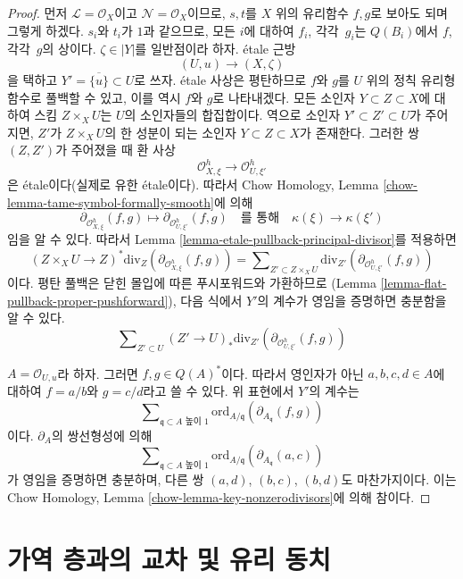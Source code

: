 \begin{proof}
\medskip\noindent
먼저 $\mathcal{L} = \mathcal{O}_X$이고
$\mathcal{N} = \mathcal{O}_X$이므로, $s, t$를 $X$ 위의 유리함수
$f, g$로 보아도 되며 그렇게 하겠다. $s_i$와 $t_i$가 $1$과 같으므로,
모든 $i$에 대하여 $f_i$, 각각\ $g_i$는 $Q(B_i)$에서 $f$, 각각\ $g$의
상이다. $\zeta \in |Y|$를 일반점이라 하자. \'etale 근방
$$
(U, u) \longrightarrow (X, \zeta)
$$
을 택하고 $Y' = \overline{\{u\}} \subset U$로 쓰자. \'etale 사상은
평탄하므로 $f$와 $g$를 $U$ 위의 정칙 유리형 함수로 풀백할 수 있고,
이를 역시 $f$와 $g$로 나타내겠다.
모든 소인자 $Y \subset Z \subset X$에 대하여 스킴
$Z \times_X U$는 $U$의 소인자들의 합집합이다. 역으로 소인자
$Y' \subset Z' \subset U$가 주어지면, $Z'$가 $Z \times_X U$의
한 성분이 되는 소인자 $Y \subset Z \subset X$가 존재한다.
그러한 쌍 $(Z, Z')$가 주어졌을 때 환 사상
$$
\mathcal{O}_{X, \xi}^h \to \mathcal{O}_{U, \xi'}^h
$$
은 \'etale이다(실제로 유한 \'etale이다). 따라서 Chow Homology,
Lemma \ref{chow-lemma-tame-symbol-formally-smooth}에 의해
$$
\partial_{\mathcal{O}_{X, \xi}^h}(f, g) \mapsto
\partial_{\mathcal{O}_{U, \xi'}^h}(f, g)
\quad\text{를 통해}\quad
\kappa(\xi) \to \kappa(\xi')
$$
임을 알 수 있다. 따라서 Lemma
\ref{lemma-etale-pullback-principal-divisor}를 적용하면
$$
(Z \times_X U \to Z)^*\text{div}_Z(\partial_{\mathcal{O}_{X, \xi}^h}(f, g))
=
\sum\nolimits_{Z' \subset Z \times_X U}
\text{div}_{Z'}(\partial_{\mathcal{O}_{U, \xi'}^h}(f, g))
$$
이다. 평탄 풀백은 닫힌 몰입에 따른 푸시포워드와 가환하므로
(Lemma \ref{lemma-flat-pullback-proper-pushforward}), 다음 식에서
$Y'$의 계수가 영임을 증명하면 충분함을 알 수 있다.
$$
\sum\nolimits_{Z' \subset U} 
(Z' \to U)_*\text{div}_{Z'}(\partial_{\mathcal{O}_{U, \xi'}^h}(f, g))
$$

\medskip\noindent
$A = \mathcal{O}_{U, u}$라 하자. 그러면 $f, g \in Q(A)^*$이다.
따라서 영인자가 아닌 $a, b, c, d \in A$에 대하여
$f = a/b$와 $g = c/d$라고 쓸 수 있다. 위 표현에서 $Y'$의 계수는
$$
\sum\nolimits_{\mathfrak q \subset A\text{ 높이 }1}
\text{ord}_{A/\mathfrak q}(\partial_{A_\mathfrak q}(f, g))
$$
이다. $\partial_A$의 쌍선형성에 의해
$$
\sum\nolimits_{\mathfrak q \subset A\text{ 높이 }1}
\text{ord}_{A/\mathfrak q}(\partial_{A_\mathfrak q}(a, c))
$$
가 영임을 증명하면 충분하며, 다른 쌍 $(a, d)$, $(b, c)$,
$(b, d)$도 마찬가지이다. 이는 Chow Homology, Lemma
\ref{chow-lemma-key-nonzerodivisors}에 의해 참이다.
\end{proof}

\section{가역 층과의 교차 및 유리 동치}
\label{section-commutativity}

